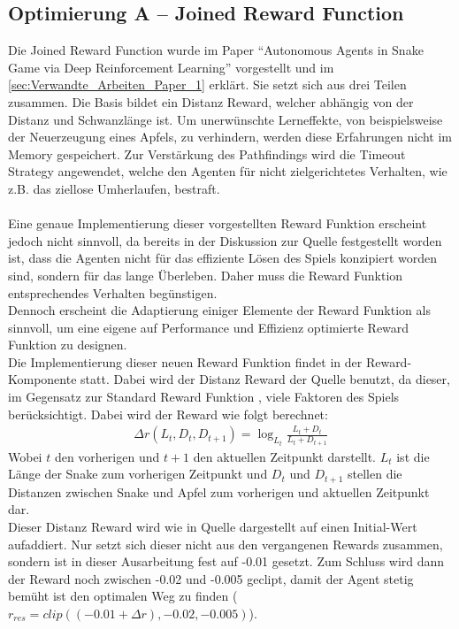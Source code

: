 \subsection{Optimierung A -- Joined Reward Function} \label{subsec:Konzept_Optimierung01}
Die Joined Reward Function wurde im Paper "`Autonomous Agents in Snake Game via Deep Reinforcement Learning"' \cite{Autonomous_Agents_in_Snake_Game_via_DRL} vorgestellt und im \autoref{sec:Verwandte_Arbeiten_Paper_1} erklärt. Sie setzt sich aus drei Teilen zusammen. Die Basis bildet ein Distanz Reward, welcher abhängig von der Distanz und Schwanzlänge ist. Um unerwünschte Lerneffekte, von beispielsweise der Neuerzeugung eines Apfels, zu verhindern, werden diese Erfahrungen nicht im Memory gespeichert. Zur Verstärkung des Pathfindings wird die Timeout Strategy angewendet, welche den Agenten für nicht zielgerichtetes Verhalten, wie z.B. das ziellose Umherlaufen, bestraft.\\
\\Eine genaue Implementierung dieser vorgestellten Reward Funktion erscheint jedoch nicht sinnvoll, da bereits in der Diskussion  zur Quelle \cite{Autonomous_Agents_in_Snake_Game_via_DRL} festgestellt worden ist, dass die Agenten nicht für das effiziente Lösen des Spiels konzipiert worden sind, sondern für das lange Überleben. Daher muss die Reward Funktion entsprechendes Verhalten begünstigen.\\
Dennoch erscheint die Adaptierung einiger Elemente der Reward Funktion als sinnvoll, um eine eigene auf Performance und Effizienz optimierte Reward Funktion zu designen.\\
Die Implementierung dieser neuen Reward Funktion findet in der Reward-Komponente statt. 
Dabei wird der Distanz Reward der Quelle \cite{Autonomous_Agents_in_Snake_Game_via_DRL} benutzt, da dieser, im Gegensatz zur Standard Reward Funktion , viele Faktoren des Spiels berücksichtigt. Dabei wird der Reward wie folgt berechnet:
\begin{align}
	\Delta r(L_t, D_t,D_{t+1}) = \log_{L_t}\frac{L_t + D_t}{L_t + D_{t + 1}}
\end{align}
Wobei $t$ den vorherigen und $t+1$ den aktuellen Zeitpunkt darstellt. $L_t$ ist die Länge der Snake zum vorherigen Zeitpunkt und $D_t$ und $D_{t+1}$ stellen die Distanzen zwischen Snake und Apfel zum vorherigen und aktuellen Zeitpunkt dar.\\
Dieser Distanz Reward wird wie in Quelle \cite{Autonomous_Agents_in_Snake_Game_via_DRL} dargestellt auf einen Initial-Wert aufaddiert. Nur setzt sich dieser nicht aus den vergangenen Rewards zusammen, sondern ist in dieser Ausarbeitung fest auf -0.01 gesetzt. Zum Schluss wird dann der Reward noch zwischen -0.02 und -0.005 geclipt, damit der Agent stetig bemüht ist den optimalen Weg zu finden ($r_{res} = clip((-0.01 + \Delta r), -0.02, -0.005)$).

